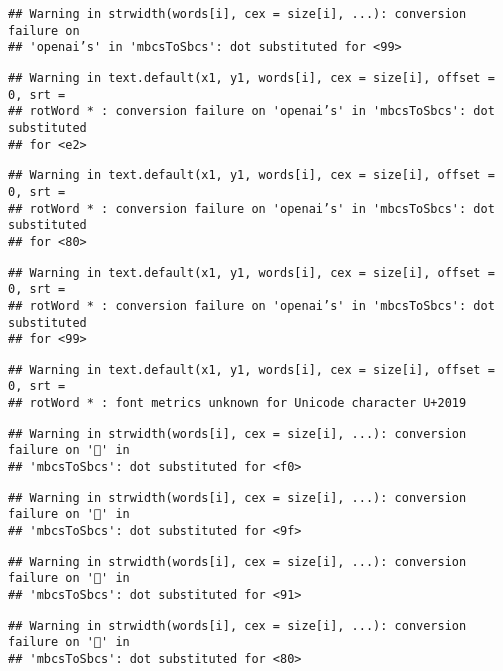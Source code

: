 \documentclass[
]{article}
\begin{document}
\begin{verbatim}
## Warning in strwidth(words[i], cex = size[i], ...): conversion failure on
## 'openai’s' in 'mbcsToSbcs': dot substituted for <99>
\end{verbatim}

\begin{verbatim}
## Warning in text.default(x1, y1, words[i], cex = size[i], offset = 0, srt =
## rotWord * : conversion failure on 'openai’s' in 'mbcsToSbcs': dot substituted
## for <e2>
\end{verbatim}

\begin{verbatim}
## Warning in text.default(x1, y1, words[i], cex = size[i], offset = 0, srt =
## rotWord * : conversion failure on 'openai’s' in 'mbcsToSbcs': dot substituted
## for <80>
\end{verbatim}

\begin{verbatim}
## Warning in text.default(x1, y1, words[i], cex = size[i], offset = 0, srt =
## rotWord * : conversion failure on 'openai’s' in 'mbcsToSbcs': dot substituted
## for <99>
\end{verbatim}

\begin{verbatim}
## Warning in text.default(x1, y1, words[i], cex = size[i], offset = 0, srt =
## rotWord * : font metrics unknown for Unicode character U+2019
\end{verbatim}

\begin{verbatim}
## Warning in strwidth(words[i], cex = size[i], ...): conversion failure on '👀' in
## 'mbcsToSbcs': dot substituted for <f0>
\end{verbatim}

\begin{verbatim}
## Warning in strwidth(words[i], cex = size[i], ...): conversion failure on '👀' in
## 'mbcsToSbcs': dot substituted for <9f>
\end{verbatim}

\begin{verbatim}
## Warning in strwidth(words[i], cex = size[i], ...): conversion failure on '👀' in
## 'mbcsToSbcs': dot substituted for <91>
\end{verbatim}

\begin{verbatim}
## Warning in strwidth(words[i], cex = size[i], ...): conversion failure on '👀' in
## 'mbcsToSbcs': dot substituted for <80>
\end{verbatim}
\end{document}
